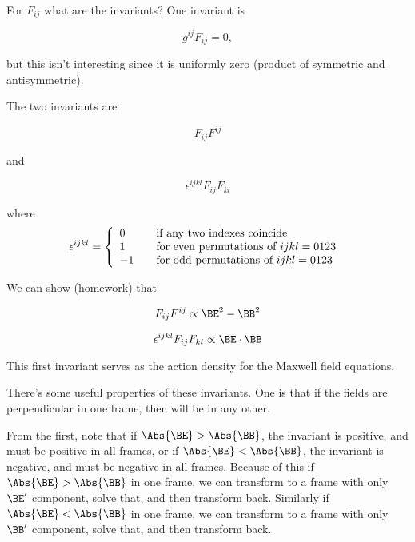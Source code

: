 For $F_{i j}$ what are the invariants?  One invariant is

\begin{equation}\label{eqn:relativisticElectrodynamicsL11:550}
g^{i j} F_{i j} = 0,
\end{equation}

but this isn't interesting since it is uniformly zero (product of symmetric and antisymmetric).

The two invariants are

\begin{equation}\label{eqn:relativisticElectrodynamicsL11:570}
F_{i j}F^{i j}
\end{equation}

and 

\begin{equation}\label{eqn:relativisticElectrodynamicsL11:590}
\epsilon^{i j k l} F_{i j}F_{k l}
\end{equation}

where
\begin{equation}\label{eqn:relativisticElectrodynamicsL11:610}
\epsilon^{i j k l} =
\left\{
\begin{array}{l l}
0 & \quad \mbox{if any two indexes coincide} \\
1 & \quad \mbox{for even permutations of $i j k l=0123$ } \\
-1 & \quad \mbox{for odd permutations of $i j k l=0123$ } \\
\end{array}
\right.
\end{equation}

We can show (homework) that

\begin{equation}\label{eqn:relativisticElectrodynamicsL11:630}
F_{i j}F^{i j} \propto \BE^2 - \BB^2
\end{equation}

\begin{equation}\label{eqn:relativisticElectrodynamicsL11:650}
\epsilon^{i j k l} F_{i j}F_{k l} \propto \BE \cdot \BB
\end{equation}

This first invariant serves as the action density for the Maxwell field equations.

There's some useful properties of these invariants.  One is that if the fields are perpendicular in one frame, then will be in any other.  

From the first, note that if $\Abs{\BE} > \Abs{\BB}$, the invariant is positive, and must be positive in all frames, or if $\Abs{\BE} < \Abs{\BB}$, the invariant is negative, and must be negative in all frames.  Because of this if $\Abs{\BE} > \Abs{\BB}$ in one frame, we can transform to a frame with only $\BE'$ component, solve that, and then transform back.  Similarly if $\Abs{\BE} < \Abs{\BB}$ in one frame, we can transform to a frame with only $\BB'$ component, solve that, and then transform back.

